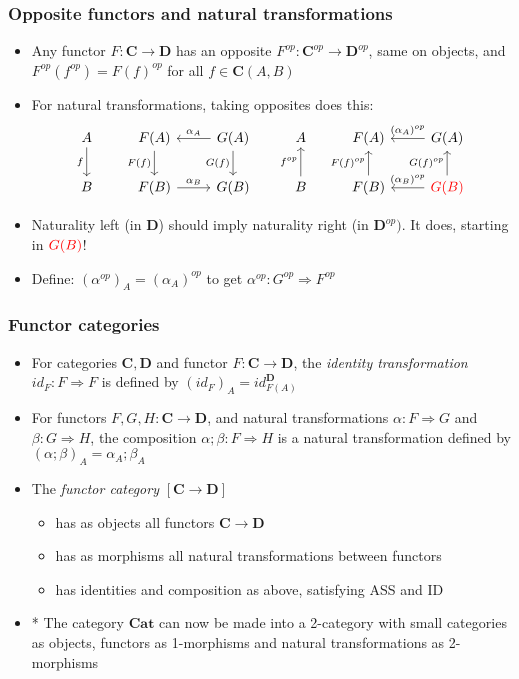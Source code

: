\documentclass[handout]{beamer}
\newcommand{\To}{\Rightarrow}
\newcommand{\bfsf}[1]{{\boldsymbol{#1}}}
\newcommand{\CC}{\bfsf{C}}
\newcommand{\DD}{\bfsf{D}}
\newcommand{\Cat}{\bfsf{Cat}}
\begin{document}
\frame
  {   
    \frametitle{Opposite functors and natural transformations}\label{Ch3:oppnat}

 \begin{itemize}[<+->]
\item Any functor $F:\CC\to\DD$ has an opposite $F^{op}:\CC^{op}\to\DD^{op}$,
same on objects,  and $F^{op}(f^{op}) = F(f)^{op}$ for all $f\in \CC(A,B)$
\item For natural transformations, taking opposites does this:
\[
\begin{tikzcd}[ampersand replacement=\&]
A \arrow[swap]{d}{f} \& F(A)  \arrow[swap]{d}{F(f)}\&\arrow[swap]{d}{G(f)} \arrow[swap]{l}{\alpha_A} G(A)
\& A \& F(A)   \& \arrow[swap]{l}{(\alpha_A)^{op}} G(A)
\\
B \& F(B)  \arrow{r}{\alpha_B} \& G(B)
\&B  \arrow{u}{f^{op}} \& F(B) \arrow{u}{F(f)^{op}}  \&\arrow{u}{G(f)^{op}} \color{red} \arrow[swap]{l}{(\alpha_B)^{op}}G(B)
\end{tikzcd}
\]
\item Naturality left (in $\DD$) should imply naturality right (in $\DD^{op})$. 
It does, starting in $\color{red}G(B)$! 
\item Define: $(\alpha^{op})_A = (\alpha_A)^{op}$ to get $\alpha^{op}: G^{op}\To F^{op}$
 \end{itemize}

 }

\frame
  {   
    \frametitle{Functor categories}\label{Ch3:functorcats}

 \begin{itemize}[<+->]
\item For categories $\CC,\DD$ and functor $F: \CC\to\DD$, the 
\emph{identity transformation} $id_F : F\To F$ is defined by $(id_F)_A = id^\DD_{F(A)}$
\item For functors $F,G,H: \CC\to\DD$, and natural
transformations $\alpha: F\To G$ and $\beta:G\To H$, the composition
$\alpha;\beta: F\To H$ is a natural transformation defined by 
$(\alpha;\beta)_A= \alpha_A;\beta_A$
 \item The \emph{functor category} $[\CC\to\DD]$
   \begin{itemize}[<+->]
\item has as objects all functors $\CC\to\DD$
\item has as morphisms all natural transformations between functors
\item has identities and composition as above, satisfying ASS and ID
   \end{itemize}
\item * The category $\Cat$ can now be made into a 2-category with
small categories as objects, functors as 1-morphisms and natural transformations
as 2-morphisms
 \end{itemize}

 }
\end{document}
